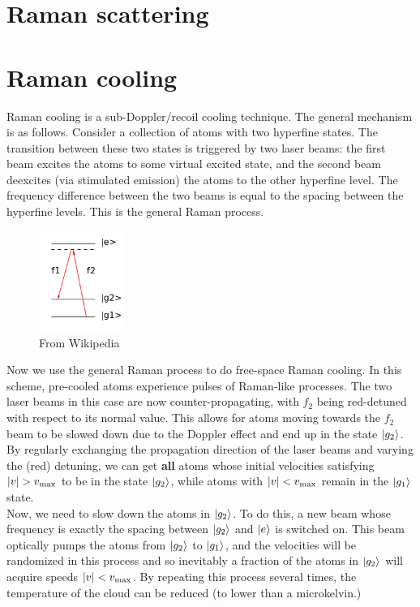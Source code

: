 \documentclass{book}
\theoremstyle{definition}
\begin{document}
\section*{Raman scattering}




\section*{Raman cooling}

Raman cooling is a sub-Doppler/recoil cooling technique. The general mechanism is as follows. Consider a collection of atoms with two hyperfine states. The transition between these two states is triggered by two laser beams: the first beam excites the atoms to some virtual excited state, and the second beam deexcites (via stimulated emission) the atoms to the other hyperfine level. The frequency difference between the two beams is equal to the spacing between the hyperfine levels. This is the general Raman process.


\begin{figure}[!htb]
	\centering
	\includegraphics[width=0.25\textwidth]{images/raman}
	\caption{From Wikipedia}
\end{figure}


Now we use the general Raman process to do free-space Raman cooling. In this scheme, pre-cooled atoms experience pulses of Raman-like processes. The two laser beams in this case are now counter-propagating, with $f_2$ being red-detuned with respect to its normal value. This allows for atoms moving towards the $f_2$ beam to be slowed down due to the Doppler effect and end up in the state $\ket{g_2}$. By regularly exchanging the propagation direction of the laser beams and varying the (red) detuning, we can get \textbf{all} atoms whose initial velocities satisfying $\abs{v} > v_\text{max}$ to be in the state $\ket{g_2}$, while atoms with $\abs{v} < v_\text{max}$ remain in the $\ket{g_1}$ state. \\

Now, we need to slow down the atoms in $\ket{g_2}$. To do this, a new beam whose frequency is exactly the spacing between $\ket{g_2}$ and $\ket{e}$ is switched on. This beam optically pumps the atoms from $\ket{g_2}$ to $\ket{g_1}$, and the velocities will be randomized in this process and so inevitably a fraction of the atoms in $\ket{g_2}$ will acquire speeds $\abs{v} < v_\text{max}$. By repeating this process several times, the temperature of the cloud can be reduced (to lower than a microkelvin.)\\
\end{document}
